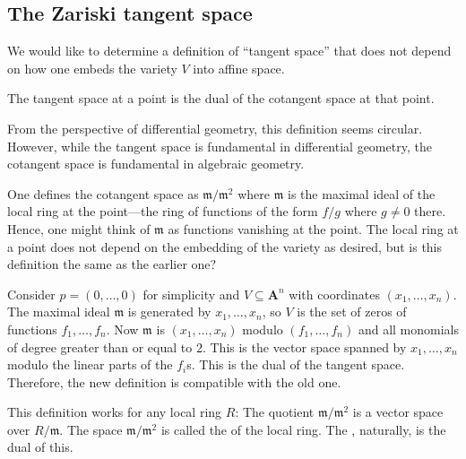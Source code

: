 \documentclass [11 pt, oneside, margin = 1 in] {article}
\begin{document}
\subsection{The Zariski tangent space}
We would like to determine a definition of ``tangent space'' that does not depend on how one embeds the variety $V$ into affine space.

 \begin{definition}[ ]\label{}\text{}
The tangent space at a point is the dual of the cotangent space at that point.
\end{definition}

\begin{remark}
	From the perspective of differential geometry, this definition seems circular. However, while the tangent space is fundamental in differential geometry, the cotangent space is fundamental in algebraic geometry.
\end{remark}

One defines the cotangent space as $\mathfrak{m}/\mathfrak{m}^2$ where $\mathfrak{m}$ is the maximal ideal of the local ring at the point---the ring of functions of the form $f/g$ where $g\ne 0$ there. Hence, one might think of $\mathfrak{m}$ as functions vanishing at the point. The local ring at a point does not depend on the embedding of the variety as desired, but is this definition the same as the earlier one?

Consider $p= (0,\hdots, 0)$ for simplicity and $V\subseteq \mathbf{A}^n$ with coordinates $(x_1,\hdots, x_n)$. The maximal ideal $\mathfrak{m}$ is generated by $x_1,\hdots,x_n$, so $V$ is the set of zeros of functions $f_1,\hdots, f_n$. Now $\mathfrak{m}$ is $(x_1,\hdots, x_n)$ modulo $(f_1,\hdots, f_n)$ and all monomials of degree greater than or equal to $2$. This is the vector space spanned by $x_1,\hdots, x_n$ modulo the linear parts of the $f_i$s. This is the dual of the tangent space. Therefore, the new definition is compatible with the old one.

\begin{remark}
	This definition works for any local ring $R$: The quotient $\mathfrak{m}/\mathfrak{m}^2$ is a vector space over $R/\mathfrak{m}$. The space $\mathfrak{m}/\mathfrak{m}^2$ is called the  of the local ring. The , naturally, is the dual of this.
\end{remark}
\end{document}

